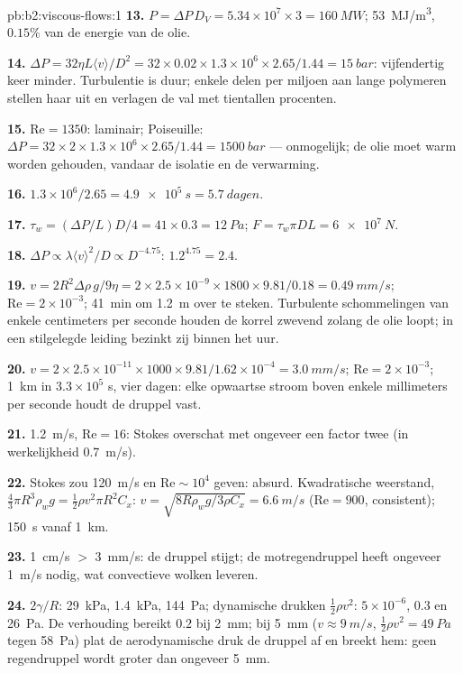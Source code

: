 \begin{solution}{pb:b2:viscous-flows:1}
\textbf{13.}
$P = \Delta P\,D_V = 5.34 \times 10^7 \times 3 = \qty{160}{MW}$;
\qty{53}{MJ/m^3}, $0.15\%$ van de energie van de olie.

\textbf{14.}
$\Delta P = 32\eta L\langle v\rangle/D^2 = 32 \times 0.02 \times 1.3 \times 10^6
\times 2.65/1.44 = \qty{15}{bar}$:
vijfendertig keer minder. Turbulentie is duur; enkele delen per miljoen aan
lange polymeren stellen haar uit en verlagen de val met tientallen
procenten.

\textbf{15.} $\mathrm{Re} = 1350$: laminair; Poiseuille:
$\Delta P = 32 \times 2 \times 1.3 \times
10^6 \times 2.65/1.44 = \qty{1500}{bar}$
--- onmogelijk; de olie moet warm worden gehouden, vandaar de isolatie en de
verwarming.

\textbf{16.} $1.3 \times 10^6/2.65 = \qty{4.9e5}{s} = \qty{5.7}{dagen}$.

\textbf{17.} $\tau_w = (\Delta P/L)D/4 = 41 \times 0.3 = \qty{12}{Pa}$;
$F = \tau_w\pi DL =
\qty{6e7}{N}$.

\textbf{18.}
$\Delta P \propto \lambda\langle v\rangle^2/D \propto D^{-4.75}$:
$1.2^{4.75} = 2.4$.

\textbf{19.}
$v = 2R^2\Delta\rho\,g/9\eta = 2 \times 2.5 \times 10^{-9} \times 1800 \times 9.81/
0.18 = \qty{0.49}{mm/s}$;
$\mathrm{Re} = 2 \times 10^{-3}$; \qty{41}{min} om \qty{1.2}{m} over te
steken. Turbulente schommelingen van enkele centimeters per seconde houden
de korrel zwevend zolang de olie loopt; in een stilgelegde leiding bezinkt
zij binnen het uur.

\textbf{20.}
$v = 2 \times 2.5 \times 10^{-11} \times 1000 \times 9.81/1.62 \times 10^{-4} =
\qty{3.0}{mm/s}$;
$\mathrm{Re} = 2 \times 10^{-3}$; \qty{1}{km} in $3.3 \times 10^5$ s, vier
dagen: elke opwaartse stroom boven enkele millimeters per seconde houdt de
druppel vast.

\textbf{21.} \qty{1.2}{m/s}, $\mathrm{Re} = 16$: Stokes overschat met
ongeveer een factor twee (in werkelijkheid \qty{0.7}{m/s}).

\textbf{22.} Stokes zou \qty{120}{m/s} en $\mathrm{Re} \sim 10^4$ geven:
absurd. Kwadratische weerstand,
$\tfrac43\pi R^3\rho_wg = \tfrac12\rho v^2\pi R^2C_x$:
$v = \sqrt{8R
\rho_wg/3\rho C_x} = \qty{6.6}{m/s}$ ($\mathrm{Re} = 900$,
consistent); \qty{150}{s} vanaf \qty{1}{km}.

\textbf{23.} \qty{1}{cm/s} $>$ \qty{3}{mm/s}: de druppel stijgt; de
motregendruppel heeft ongeveer \qty{1}{m/s} nodig, wat convectieve wolken
leveren.

\textbf{24.} $2\gamma/R$: \qty{29}{kPa}, \qty{1.4}{kPa}, \qty{144}{Pa};
dynamische drukken $\tfrac12\rho v^2$: $5 \times 10^{-6}$, $0.3$ en
\qty{26}{Pa}. De verhouding bereikt $0.2$ bij \qty{2}{mm}; bij \qty{5}{mm}
($v \approx \qty{9}{m/s}$, $\tfrac12\rho v^2 =
\qty{49}{Pa}$ tegen
\qty{58}{Pa}) plat de aerodynamische druk de druppel af en breekt hem: geen
regendruppel wordt groter dan ongeveer \qty{5}{mm}.


\end{solution}
